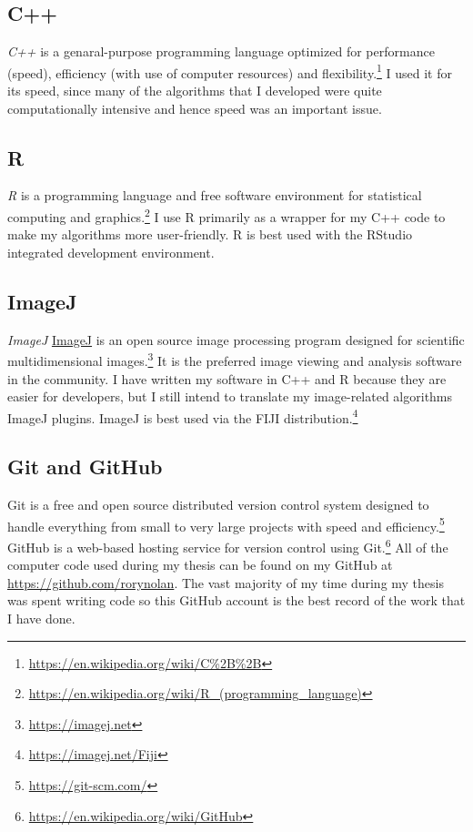 \documentclass[12pt,]{book}
\let\rmarkdownfootnote\footnote%
\def\footnote{\protect\rmarkdownfootnote}
\theoremstyle{definition}
\theoremstyle{definition}
\theoremstyle{definition}
\theoremstyle{remark}
\begin{document}
\subsection{C++}\label{c}

\emph{C++} \citep{cpp} is a genaral-purpose programming language
optimized for performance (speed), efficiency (with use of computer
resources) and flexibility.\footnote{\url{https://en.wikipedia.org/wiki/C\%2B\%2B}}
I used it for its speed, since many of the algorithms that I developed
were quite computationally intensive and hence speed was an important
issue.

\subsection{R}\label{r}

\emph{R} \citep{R} is a programming language and free software
environment for statistical computing and graphics.\footnote{\url{https://en.wikipedia.org/wiki/R_(programming_language)}}
I use R primarily as a wrapper for my C++ code to make my algorithms
more user-friendly. R is best used with the RStudio integrated
development environment.

\hypertarget{imagej}{\subsection{ImageJ}\label{imagej}}

\emph{ImageJ} \protect\hyperlink{imagej}{ImageJ} is an open source image
processing program designed for scientific multidimensional
images.\footnote{\url{https://imagej.net}} It is the preferred image
viewing and analysis software in the community. I have written my
software in C++ and R because they are easier for developers, but I
still intend to translate my image-related algorithms ImageJ plugins.
ImageJ is best used via the FIJI \citep{FIJI} distribution.\footnote{\url{https://imagej.net/Fiji}}

\subsection{Git and GitHub}\label{git-and-github}

Git is a free and open source distributed version control system
designed to handle everything from small to very large projects with
speed and efficiency.\footnote{\url{https://git-scm.com/}} GitHub is a
web-based hosting service for version control using Git.\footnote{\url{https://en.wikipedia.org/wiki/GitHub}}
All of the computer code used during my thesis can be found on my GitHub
at \url{https://github.com/rorynolan}. The vast majority of my time
during my thesis was spent writing code so this GitHub account is the
best record of the work that I have done.
\end{document}
